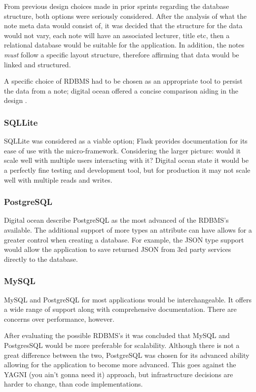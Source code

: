 From previous design choices made in prior sprints regarding the database structure, both options were seriously considered. After the analysis of what the note meta data would consist of, it was decided that the structure for the data would not vary, each note will have an associated lecturer, title etc, then a relational database would be suitable for the application. In addition, the notes \textit{must} follow a specific layout structure, therefore affirming that data would be linked and structured.

A specific choice of RDBMS had to be chosen as an appropriate tool to persist the data from a note; digital ocean offered a concise comparison aiding in the design \cite{citeulike:14019772}.
\subsubsection{SQLLite}
SQLLite was considered as a viable option; Flask provides documentation for its ease of use with the micro-framework. Considering the larger picture: would it scale well with multiple users interacting with it? Digital ocean state it would be a perfectly fine testing and development tool, but for production it may not scale well with multiple reads and writes.
\subsubsection{PostgreSQL}
Digital ocean describe PostgreSQL as the most advanced of the RDBMS's available. The additional support of more types an attribute can have allows for a greater control when creating a database. For example, the JSON type support would allow the application to save returned JSON from 3rd party services directly to the database.
\subsubsection{MySQL}
MySQL and PostgreSQL for most applications would be interchangeable. It offers a wide range of support along with comprehensive documentation. There are concerns over performance, however.

\noindent
After evaluating the possible RDBMS's it was concluded that MySQL and PostgresSQL would be more preferable for scalability. Although there is not a great difference between the two, PostgreSQL was chosen for its advanced ability allowing for the application to become more advanced. This goes against the YAGNI (you ain't gonna need it) approach, but infrastructure decisions are harder to change, than code implementations.




